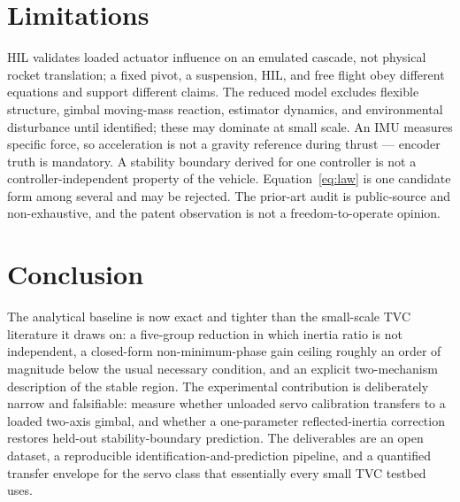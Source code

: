 \documentclass[11pt,a4paper]{article}
\begin{document}
\section{Limitations}

HIL validates loaded actuator influence on an emulated cascade, not physical rocket translation; a
fixed pivot, a suspension, HIL, and free flight obey different equations and support different
claims. The reduced model excludes flexible structure, gimbal moving-mass reaction, estimator
dynamics, and environmental disturbance until identified; these may dominate at small scale. An IMU
measures specific force, so acceleration is not a gravity reference during thrust --- encoder truth is
mandatory. A stability boundary derived for one controller is not a controller-independent property
of the vehicle. Equation~\eqref{eq:law} is one candidate form among several and may be rejected. The
prior-art audit is public-source and non-exhaustive, and the patent observation is not a
freedom-to-operate opinion.

\section{Conclusion}

The analytical baseline is now exact and tighter than the small-scale TVC literature it draws on: a
five-group reduction in which inertia ratio is not independent, a closed-form non-minimum-phase gain
ceiling roughly an order of magnitude below the usual necessary condition, and an explicit
two-mechanism description of the stable region. The experimental contribution is deliberately narrow
and falsifiable: measure whether unloaded servo calibration transfers to a loaded two-axis gimbal,
and whether a one-parameter reflected-inertia correction restores held-out stability-boundary
prediction. The deliverables are an open dataset, a reproducible identification-and-prediction
pipeline, and a quantified transfer envelope for the servo class that essentially every small TVC
testbed uses.
\end{document}
